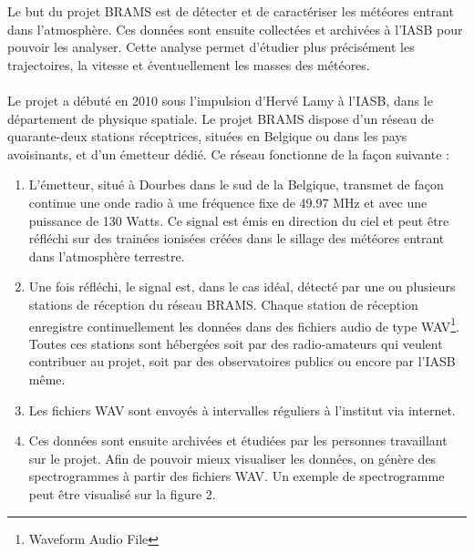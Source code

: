 \documentclass[11pt]{article}
\begin{document}
Le but du projet BRAMS est de détecter et de caractériser les météores entrant dans l'atmosphère.
Ces données sont ensuite collectées et archivées à l'IASB pour pouvoir les analyser.
Cette analyse permet d'étudier plus précisément les trajectoires, la vitesse et éventuellement les masses des météores.\\
\\
Le projet a débuté en 2010 sous l'impulsion d'Hervé Lamy à l'IASB, dans le département de physique spatiale.
Le projet BRAMS dispose d'un réseau de quarante-deux stations réceptrices, situées en Belgique ou dans les pays avoisinants, et d'un émetteur dédié.
Ce réseau fonctionne de la façon suivante :
\begin{enumerate}
    \item L'émetteur, situé à Dourbes dans le sud de la Belgique, transmet de façon continue une onde radio à une fréquence fixe de 49.97 MHz et avec une puissance de 130 Watts.
          Ce signal est émis en direction du ciel et peut être réfléchi sur des trainées ionisées créées dans le sillage des météores entrant dans l'atmosphère terrestre.
    \item Une fois réfléchi, le signal est, dans le cas idéal, détecté par une ou plusieurs stations de réception du réseau BRAMS.
          Chaque station de réception enregistre continuellement les données dans des fichiers audio de type WAV\footnote{Waveform Audio File}.
          Toutes ces stations sont hébergées soit par des radio-amateurs qui veulent contribuer au projet, soit par des observatoires publics ou encore par l'IASB même.
    \item Les fichiers WAV sont envoyés à intervalles réguliers à l'institut via internet.
    \item Ces données sont ensuite archivées et étudiées par les personnes travaillant sur le projet.
          Afin de pouvoir mieux visualiser les données, on génère des spectrogrammes à partir des fichiers WAV.
          Un exemple de spectrogramme peut être visualisé sur la figure 2.
\end{enumerate}
\end{document}
